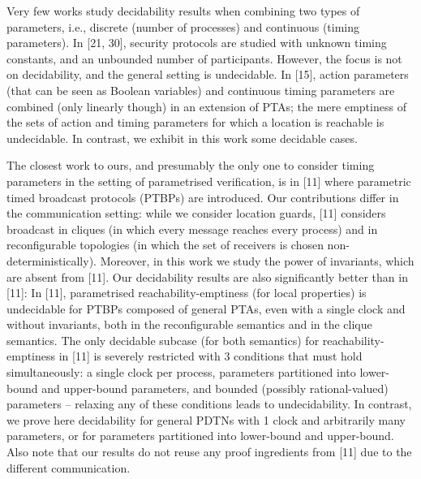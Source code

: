  
 
Very few works study decidability results when combining two types of parameters, i.e., discrete (number of processes) and continuous (timing parameters). In [21, 30], security protocols are studied with unknown timing constants, and an unbounded number of participants. However, the focus is not on decidability, and the general setting is undecidable. In [15], action parameters (that can be seen as Boolean variables) and continuous timing parameters are combined (only linearly though) in an extension of PTAs; the mere emptiness of the sets of action and timing parameters for which a location is reachable is undecidable. In contrast, we exhibit in this work some decidable cases.\par
 
 
 
The closest work to ours, and presumably the only one to consider timing parameters in the setting of parametrised verification, is in [11] where parametric timed broadcast protocols (PTBPs) are introduced. Our contributions differ in the communication setting: while we consider location guards, [11] considers broadcast in cliques (in which every message reaches every process) and in reconfigurable topologies (in which the set of receivers is chosen non-deterministically). Moreover, in this work we study the power of invariants, which are absent from [11]. Our decidability results are also significantly better than in [11]: In [11], parametrised reachability-emptiness (for local properties) is undecidable for PTBPs composed of general PTAs, even with a single clock and without invariants, both in the reconfigurable semantics and in the clique semantics. The only decidable subcase (for both semantics) for reachability-emptiness in [11] is severely restricted with 3 conditions that must hold simultaneously: a single clock per process, parameters partitioned into lower-bound and upper-bound parameters, and bounded (possibly rational-valued) parameters -- relaxing any of these conditions leads to undecidability. In contrast, we prove here decidability for general PDTNs with 1 clock and arbitrarily many parameters, or for parameters partitioned into lower-bound and upper-bound. Also note that our results do not reuse any proof ingredients from [11] due to the different communication.\par
 
